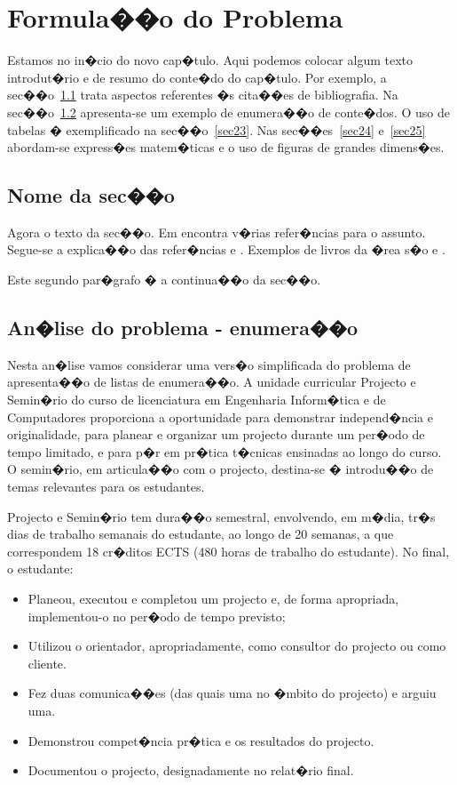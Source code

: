 %
%
\chapter{Formula��o do Problema} \label{cap2}

Estamos no in�cio do novo cap�tulo. Aqui podemos colocar algum texto introdut�rio e 
de resumo do conte�do do cap�tulo. Por exemplo, a sec��o~\ref{sec21} trata aspectos
referentes �s cita��es de bibliografia. Na sec��o~\ref{sec22} apresenta-se um exemplo 
de enumera��o de conte�dos. O uso de tabelas � exemplificado na sec��o~\ref{sec23}.
Nas sec��es~\ref{sec24} e~\ref{sec25} abordam-se express�es matem�ticas e o uso de
figuras de grandes dimens�es.


%
%
\section{Nome da sec��o} \label{sec21}
Agora o texto da sec��o. Em \cite{wiki:bigdata2015} encontra v�rias refer�ncias para o assunto. Segue-se a explica��o das refer�ncias \cite{Boytsov:2011:IMA:1963190.1963191} e \cite{Jurkiewicz:2015:MVA:2627368.2656337}. Exemplos de livros da �rea s�o \cite{Neumann:1958:CB:578873} e \cite{Kernighan:1982:EPS:578130}.

Este segundo par�grafo � a continua��o da sec��o.


%
%
\section{An�lise do problema - enumera��o} \label{sec22}
Nesta an�lise vamos considerar uma vers�o simplificada do problema de apresenta��o de listas 
de enumera��o. A unidade curricular Projecto e Semin�rio do curso de licenciatura em Engenharia Inform�tica e de
Computadores proporciona a oportunidade para demonstrar independ�ncia e originalidade, para planear e
organizar um projecto durante um per�odo de tempo limitado, e para p�r em pr�tica t�cnicas ensinadas ao
longo do curso. O semin�rio, em articula��o com o projecto, destina-se � introdu��o de temas relevantes para
os estudantes.

Projecto e Semin�rio tem dura��o semestral, envolvendo, em m�dia, tr�s dias de trabalho semanais do
estudante, ao longo de 20 semanas, a que correspondem 18 cr�ditos ECTS (480 horas de trabalho do
estudante). No final, o estudante:
\begin{itemize}
	\item [1.] Planeou, executou e completou um projecto e, de forma apropriada, implementou-o no per�odo de
tempo previsto;
  \item [2.] Utilizou o orientador, apropriadamente, como consultor do projecto ou como cliente.
  \item [3.] Fez duas comunica��es (das quais uma no �mbito do projecto) e arguiu uma.
  \item [4.] Demonstrou compet�ncia pr�tica e os resultados do projecto.
  \item [5.] Documentou o projecto, designadamente no relat�rio final.
\end{itemize}

